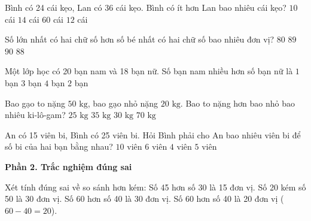 \begin{ex} %
Bình có 24 cái kẹo, Lan có 36 cái kẹo. Bình có ít hơn Lan bao nhiêu cái kẹo?
\choice
{$10$ cái}
{$14$ cái}
{$60$ cái}
{\True $12$ cái}
\end{ex}

\begin{ex} %
Số lớn nhất có hai chữ số hơn số bé nhất có hai chữ số bao nhiêu đơn vị?
\choice
{$80$}
{\True $89$}
{$90$}
{$88$}
\end{ex}

\begin{ex} %
Một lớp học có 20 bạn nam và 18 bạn nữ. Số bạn nam nhiều hơn số bạn nữ là
\choice
{$1$ bạn}
{$3$ bạn}
{$4$ bạn}
{\True $2$ bạn}
\end{ex}

\begin{ex} %
Bao gạo to nặng $50\text{ kg}$, bao gạo nhỏ nặng $20\text{ kg}$. Bao to nặng hơn bao nhỏ bao nhiêu ki-lô-gam?
\choice
{$25\text{ kg}$}
{$35\text{ kg}$}
{\True $30\text{ kg}$}
{$70\text{ kg}$}
\end{ex}

\begin{ex} %
An có 15 viên bi, Bình có 25 viên bi. Hỏi Bình phải cho An bao nhiêu viên bi để số bi của hai bạn bằng nhau?
\choice
{$10$ viên}
{$6$ viên}
{$4$ viên}
{\True $5$ viên}
\end{ex}

\textbf{Phần 2. Trắc nghiệm đúng sai}

\begin{ex} %
Xét tính đúng sai về so sánh hơn kém:
\choiceTF
{\True Số 45 hơn số 30 là 15 đơn vị.}
{\True Số 20 kém số 50 là 30 đơn vị.}
{Số 60 hơn số 40 là 30 đơn vị.}
{\True Số 60 hơn số 40 là 20 đơn vị ($60 - 40 = 20$).}
\end{ex}

